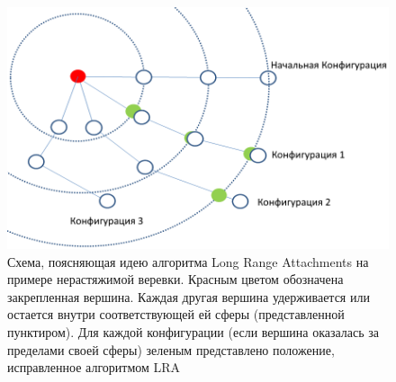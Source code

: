 	\begin{figure}[ht!] 
		\center
		\includegraphics [scale=0.53] {my_folder/images//lra}
		\caption{Схема, поясняющая идею алгоритма Long Range Attachments на примере нерастяжимой веревки. Красным цветом обозначена закрепленная вершина. Каждая другая вершина удерживается или остается внутри соответствующей ей сферы (представленной пунктиром). Для каждой конфигурации (если вершина оказалась за пределами своей сферы) зеленым представлено положение, исправленное алгоритмом LRA}
		\label{fig:lra}  
	\end{figure}
	
%
